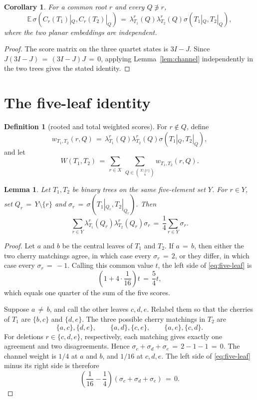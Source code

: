 \documentclass[11pt]{article}
\newtheorem{lemma}[theorem]{Lemma}
\newtheorem{corollary}[theorem]{Corollary}
\theoremstyle{definition}
\newtheorem{definition}{Definition}
\begin{document}
\begin{corollary}\label{cor:channel-score}
For a common root $r$ and every $Q\not\ni r$,
\begin{equation}\label{eq:channel-score}
 \mathbb E\,\sigma(C_r(T_1)|_Q,C_r(T_2)|_Q)
 \,=\,\lambda_{T_1}^r(Q)\lambda_{T_2}^r(Q)
  \sigma(T_1|_Q,T_2|_Q),
\end{equation}
where the two planar embeddings are independent.
\end{corollary}

\begin{proof}
The score matrix on the three quartet states is $3I-J$.  Since
$J(3I-J)\,=\,(3I-J)J\,=\,0$, applying Lemma~\ref{lem:channel} independently in
the two trees gives the stated identity.
\end{proof}

\section{The five-leaf identity}

\begin{definition}[rooted and total weighted scores]\label{def:rooted-weight}
For $r\notin Q$, define
\[
 w_{T_1,T_2}(r,Q)\,=\,
 \lambda_{T_1}^r(Q)\lambda_{T_2}^r(Q)
 \sigma(T_1|_Q,T_2|_Q),
\]
and let
\[
 W(T_1,T_2)\,=\,
 \sum_{r\in X}\ \sum_{Q\in\binom{X\setminus\{r\}}4}
 w_{T_1,T_2}(r,Q).
\]
\end{definition}

\begin{lemma}\label{lem:five-leaf}
Let $T_1,T_2$ be binary trees on the same five-element set $Y$.  For
$r\in Y$, set $Q_r\,=\,Y\setminus\{r\}$ and
$\sigma_r\,=\,\sigma(T_1|_{Q_r},T_2|_{Q_r})$.  Then
\begin{equation}\label{eq:five-leaf}
 \sum_{r\in Y}
 \lambda_{T_1}^r(Q_r)\lambda_{T_2}^r(Q_r)\sigma_r
 \,=\,\frac14\sum_{r\in Y}\sigma_r.
\end{equation}
\end{lemma}

\begin{proof}
Let $a$ and $b$ be the central leaves of $T_1$ and $T_2$.  If $a\,=\,b$,
then either the two cherry matchings agree, in which case every
$\sigma_r\,=\,2$, or they differ, in which case every $\sigma_r\,=\,-1$.  Calling
this common value $t$, the left side of \eqref{eq:five-leaf} is
\[
 \left(1+4\cdot\frac1{16}\right)t\,=\,\frac54t,
\]
which equals one quarter of the sum of the five scores.

Suppose $a\,\ne\,b$, and call the other leaves $c,d,e$.  Relabel them so
that the cherries of $T_1$ are $\{b,c\}$ and $\{d,e\}$.  The three
possible cherry matchings in $T_2$ are
\[
 \{a,c\},\{d,e\},\qquad
 \{a,d\},\{c,e\},\qquad
 \{a,e\},\{c,d\}.
\]
For deletions $r\in\{c,d,e\}$, respectively, each matching gives exactly
one agreement and two disagreements.  Hence
$\sigma_c+\sigma_d+\sigma_e\,=\,2-1-1\,=\,0$.  The channel weight is $1/4$ at
$a$ and $b$, and $1/16$ at $c,d,e$.  The left side of
\eqref{eq:five-leaf} minus its right side is therefore
\[
 \left(\frac1{16}-\frac14\right)
 (\sigma_c+\sigma_d+\sigma_e)\,=\,0.
\]
\end{proof}
\end{document}
